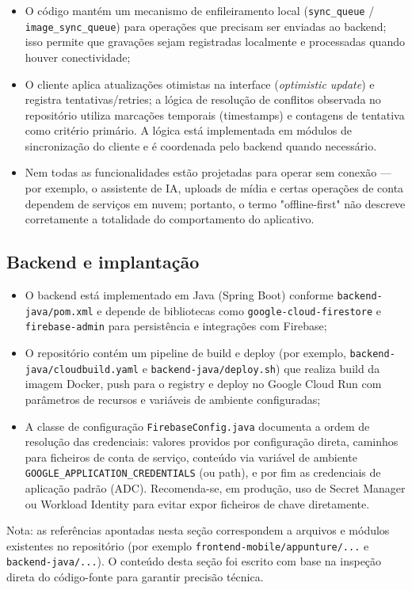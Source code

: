 \begin{itemize}
    \item O código mantém um mecanismo de enfileiramento local (\texttt{sync\_queue} / \texttt{image\_sync\_queue}) para operações que precisam ser enviadas ao backend; isso permite que gravações sejam registradas localmente e processadas quando houver conectividade;
    \item O cliente aplica atualizações otimistas na interface (\textit{optimistic update}) e registra tentativas/retries; a lógica de resolução de conflitos observada no repositório utiliza marcações temporais (timestamps) e contagens de tentativa como critério primário. A lógica está implementada em módulos de sincronização do cliente e é coordenada pelo backend quando necessário.
    \item Nem todas as funcionalidades estão projetadas para operar sem conexão — por exemplo, o assistente de IA, uploads de mídia e certas operações de conta dependem de serviços em nuvem; portanto, o termo "offline-first" não descreve corretamente a totalidade do comportamento do aplicativo.
\end{itemize}

\subsection{Backend e implantação}

\begin{itemize}
    \item O backend está implementado em Java (Spring Boot) conforme \texttt{backend-java/pom.xml} e depende de bibliotecas como \texttt{google-cloud-firestore} e \texttt{firebase-admin} para persistência e integrações com Firebase;
    \item O repositório contém um pipeline de build e deploy (por exemplo, \texttt{backend-java/cloudbuild.yaml} e \texttt{backend-java/deploy.sh}) que realiza build da imagem Docker, push para o registry e deploy no Google Cloud Run com parâmetros de recursos e variáveis de ambiente configuradas;
    \item A classe de configuração \texttt{FirebaseConfig.java} documenta a ordem de resolução das credenciais: valores providos por configuração direta, caminhos para ficheiros de conta de serviço, conteúdo via variável de ambiente \texttt{GOOGLE\_APPLICATION\_CREDENTIALS} (ou path), e por fim as credenciais de aplicação padrão (ADC). Recomenda-se, em produção, uso de Secret Manager ou Workload Identity para evitar expor ficheiros de chave diretamente.
\end{itemize}

\bigskip
\noindent
Nota: as referências apontadas nesta seção correspondem a arquivos e módulos existentes no repositório (por exemplo \texttt{frontend-mobile/appunture/...} e \texttt{backend-java/...}). O conteúdo desta seção foi escrito com base na inspeção direta do código-fonte para garantir precisão técnica.


